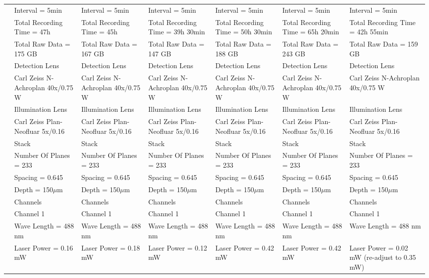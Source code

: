 \begin{sidewaystable}[!ht]
\begin{longtable}{@{} l l l l l l l @{}}
& Interval = 5min & Interval = 5min & Interval = 5min & Interval = 5min & Interval = 5min & Interval = 5min\\
& Total Recording Time = 47h & Total Recording Time = 45h & Total Recording Time = 39h 30min & Total Recording Time = 50h 30min & Total Recording Time = 65h 20min & Total Recording Time = 42h 55min\\
& Total Raw Data = 175 GB & Total Raw Data = 167 GB & Total Raw Data = 147 GB & Total Raw Data = 188 GB & Total Raw Data = 243 GB & Total Raw Data = 159 GB\\
& Detection Lens & Detection Lens & Detection Lens & Detection Lens & Detection Lens & Detection Lens\\
& Carl Zeiss N-Achroplan 40x/0.75 W & Carl Zeiss N-Achroplan 40x/0.75 W & Carl Zeiss N-Achroplan 40x/0.75 W & Carl Zeiss N-Achroplan 40x/0.75 W & Carl Zeiss N-Achroplan 40x/0.75 W & Carl Zeiss N-Achroplan 40x/0.75 W\\
& Illumination Lens & Illumination Lens & Illumination Lens & Illumination Lens & Illumination Lens & Illumination Lens\\
& Carl Zeiss Plan-Neofluar 5x/0.16 & Carl Zeiss Plan-Neofluar 5x/0.16 & Carl Zeiss Plan-Neofluar 5x/0.16 & Carl Zeiss Plan-Neofluar 5x/0.16 & Carl Zeiss Plan-Neofluar 5x/0.16 & Carl Zeiss Plan-Neofluar 5x/0.16\\
& Stack & Stack & Stack & Stack & Stack & Stack\\
& Number Of Planes = 233 & Number Of Planes = 233 & Number Of Planes = 233 & Number Of Planes = 233 & Number Of Planes = 233 & Number Of Planes = 233\\
& Spacing = 0.645 & Spacing = 0.645 & Spacing = 0.645 & Spacing = 0.645 & Spacing = 0.645 & Spacing = 0.645\\
& Depth = 150$\mu$m & Depth = 150$\mu$m & Depth = 150$\mu$m & Depth = 150$\mu$m & Depth = 150$\mu$m & Depth = 150$\mu$m\\
& Channels & Channels & Channels & Channels & Channels & Channels\\
& Channel 1 & Channel 1 & Channel 1 & Channel 1 & Channel 1 & Channel 1\\
& Wave Length = 488 nm & Wave Length = 488 nm & Wave Length = 488 nm & Wave Length = 488 nm & Wave Length = 488 nm & Wave Length = 488 nm\\
& Laser Power = 0.16 mW & Laser Power = 0.18 mW & Laser Power = 0.12 mW & Laser Power = 0.42 mW & Laser Power = 0.42 mW & Laser Power = 0.02 mW (re-adjust to 0.35 mW)\\

\end{longtable}
\end{sidewaystable}
